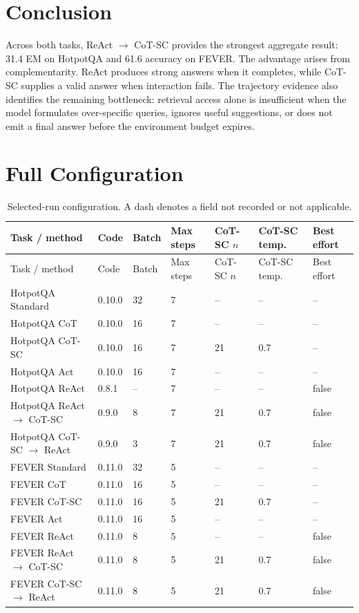\documentclass[10pt]{article}
\begin{document}
\section{Conclusion}

Across both tasks, ReAct $\rightarrow$ CoT-SC provides the strongest aggregate result: 31.4 EM on HotpotQA and 61.6 accuracy on FEVER. The advantage arises from complementarity. ReAct produces strong answers when it completes, while CoT-SC supplies a valid answer when interaction fails. The trajectory evidence also identifies the remaining bottleneck: retrieval access alone is insufficient when the model formulates over-specific queries, ignores useful suggestions, or does not emit a final answer before the environment budget expires.

\appendix
\section{Full Configuration}

\begin{longtable}{p{2.6cm}p{1.15cm}p{1.1cm}p{1.3cm}p{1.1cm}p{1.25cm}p{1.45cm}}
\caption{Selected-run configuration. A dash denotes a field not recorded or not applicable.}\label{tab:config}\\
\toprule
Task / method & Code & Batch & Max steps & CoT-SC $n$ & CoT-SC temp. & Best effort \\
\midrule
\endfirsthead
\toprule
Task / method & Code & Batch & Max steps & CoT-SC $n$ & CoT-SC temp. & Best effort \\
\midrule
\endhead
HotpotQA Standard & 0.10.0 & 32 & 7 & -- & -- & -- \\
HotpotQA CoT & 0.10.0 & 16 & 7 & -- & -- & -- \\
HotpotQA CoT-SC & 0.10.0 & 16 & 7 & 21 & 0.7 & -- \\
HotpotQA Act & 0.10.0 & 16 & 7 & -- & -- & -- \\
HotpotQA ReAct & 0.8.1 & -- & 7 & -- & -- & false \\
HotpotQA ReAct $\rightarrow$ CoT-SC & 0.9.0 & 8 & 7 & 21 & 0.7 & false \\
HotpotQA CoT-SC $\rightarrow$ ReAct & 0.9.0 & 3 & 7 & 21 & 0.7 & false \\
FEVER Standard & 0.11.0 & 32 & 5 & -- & -- & -- \\
FEVER CoT & 0.11.0 & 16 & 5 & -- & -- & -- \\
FEVER CoT-SC & 0.11.0 & 16 & 5 & 21 & 0.7 & -- \\
FEVER Act & 0.11.0 & 16 & 5 & -- & -- & -- \\
FEVER ReAct & 0.11.0 & 8 & 5 & -- & -- & false \\
FEVER ReAct $\rightarrow$ CoT-SC & 0.11.0 & 8 & 5 & 21 & 0.7 & false \\
FEVER CoT-SC $\rightarrow$ ReAct & 0.11.0 & 8 & 5 & 21 & 0.7 & false \\
\bottomrule
\end{longtable}
\end{document}
